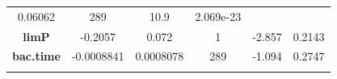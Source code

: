 \documentclass[]{article}
\begin{document}
\begin{longtable}[]{@{}cccccc@{}}
\begin{minipage}[t]{0.14\columnwidth}
0.06062\strut
\end{minipage} & \begin{minipage}[t]{0.06\columnwidth}\centering\strut
289\strut
\end{minipage} & \begin{minipage}[t]{0.12\columnwidth}\centering\strut
10.9\strut
\end{minipage} & \begin{minipage}[t]{0.12\columnwidth}\centering\strut
2.069e-23\strut
\end{minipage}\tabularnewline
\begin{minipage}[t]{0.23\columnwidth}\centering\strut
\textbf{limP}\strut
\end{minipage} & \begin{minipage}[t]{0.13\columnwidth}\centering\strut
-0.2057\strut
\end{minipage} & \begin{minipage}[t]{0.14\columnwidth}\centering\strut
0.072\strut
\end{minipage} & \begin{minipage}[t]{0.06\columnwidth}\centering\strut
1\strut
\end{minipage} & \begin{minipage}[t]{0.12\columnwidth}\centering\strut
-2.857\strut
\end{minipage} & \begin{minipage}[t]{0.12\columnwidth}\centering\strut
0.2143\strut
\end{minipage}\tabularnewline
\begin{minipage}[t]{0.23\columnwidth}\centering\strut
\textbf{bac.time}\strut
\end{minipage} & \begin{minipage}[t]{0.13\columnwidth}\centering\strut
-0.0008841\strut
\end{minipage} & \begin{minipage}[t]{0.14\columnwidth}\centering\strut
0.0008078\strut
\end{minipage} & \begin{minipage}[t]{0.06\columnwidth}\centering\strut
289\strut
\end{minipage} & \begin{minipage}[t]{0.12\columnwidth}\centering\strut
-1.094\strut
\end{minipage} & \begin{minipage}[t]{0.12\columnwidth}\centering\strut
0.2747\strut
\end{minipage}\tabularnewline
\begin{minipage}[t]{0.23\columnwidth}\centering\strut

\end{minipage}
\end{longtable}
\end{document}
